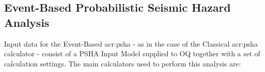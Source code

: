 \subsection{Event-Based Probabilistic Seismic Hazard Analysis}
\label{section:event-basedPSHA}
Input data for the Event-Based \gls{acr:psha} - as in the case of the 
Classical \gls{acr:psha} calculator - consist of a PSHA Input Model 
supplied to OQ together with a set of calculation settings.
%
The main calculators  used to perform this analysis are:
